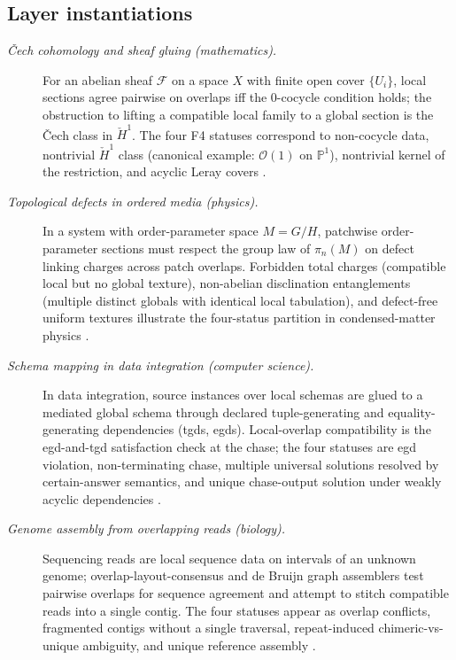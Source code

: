 \documentclass[11pt]{article}
\theoremstyle{definition}
\begin{document}
\subsection*{Layer instantiations}\label{layer-inst:F4}

\begin{description}
\item[\emph{\v{C}ech cohomology and sheaf gluing (mathematics).}]
For an abelian sheaf \(\mathcal F\) on a space \(X\) with finite
open cover \(\{U_i\}\), local sections agree pairwise on overlaps
iff the 0-cocycle condition holds; the obstruction to lifting a
compatible local family to a global section is the \v{C}ech class
in \(\check H^1\).  The four F4 statuses correspond to non-cocycle
data, nontrivial \(\check H^1\) class (canonical example:
\(\mathcal O(1)\) on \(\mathbb P^1\)), nontrivial kernel of the
restriction, and acyclic Leray covers
\citep{Hartshorne1977AlgebraicGeometry}.

\item[\emph{Topological defects in ordered media (physics).}]
In a system with order-parameter space \(M = G/H\), patchwise
order-parameter sections must respect the group law of \(\pi_n(M)\)
on defect linking charges across patch overlaps.  Forbidden total
charges (compatible local but no global texture), non-abelian
disclination entanglements (multiple distinct globals with
identical local tabulation), and defect-free uniform textures
illustrate the four-status partition in condensed-matter physics
\citep{Mermin1979TopologicalDefects}.

\item[\emph{Schema mapping in data integration (computer science).}]
In data integration, source instances over local schemas are
glued to a mediated global schema through declared
tuple-generating and equality-generating dependencies (tgds, egds).
Local-overlap compatibility is the egd-and-tgd satisfaction check
at the chase; the four statuses are egd violation,
non-terminating chase, multiple universal solutions resolved by
certain-answer semantics, and unique chase-output solution under
weakly acyclic dependencies \citep{Fagin2005DataExchange}.

\item[\emph{Genome assembly from overlapping reads (biology).}]
Sequencing reads are local sequence data on intervals of an
unknown genome; overlap-layout-consensus and de Bruijn graph
assemblers test pairwise overlaps for sequence agreement and
attempt to stitch compatible reads into a single contig.  The
four statuses appear as overlap conflicts, fragmented contigs
without a single traversal, repeat-induced chimeric-vs-unique
ambiguity, and unique reference assembly
\citep{PevznerTangWaterman2001Eulerian}.


\end{description}
\end{document}
